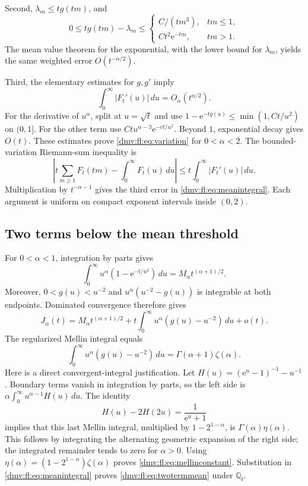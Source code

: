 \documentclass[11pt,letterpaper]{article}
\numberwithin{equation}{section}
\theoremstyle{definition}\newtheorem{definition}[theorem]{Definition}
\theoremstyle{remark}\newtheorem{remark}[theorem]{Remark}
\newcommand{\ee}{\mathrm e}
\newcommand{\Q}{\mathbb Q}
\begin{document}
Second, $\lambda_m\le tg(tm)$, and
\[
 0\le tg(tm)-\lambda_m\le
 \begin{cases}
 C/(tm^3),&tm\le1,\\
 Ct^2\ee^{-tm},&tm>1.
 \end{cases}
\]
The mean value theorem for the exponential, with the lower bound for
$\lambda_m$, yields the same weighted error $O(t^{-\alpha/2})$.

Third, the elementary estimates for $g,g'$ imply
\begin{equation}\label{dmv:fl:eq:variation}
 \int_0^\infty|F_t'(u)|\,du=O_\alpha(t^{\alpha/2}).
\end{equation}
For the derivative of $u^\alpha$, split at $u=\sqrt t$ and use
$1-\ee^{-tg(u)}\le\min(1,Ct/u^2)$ on $(0,1]$. For the other term
use $Ct u^{\alpha-3}\ee^{-ct/u^2}$. Beyond $1$, exponential decay
gives $O(t)$. These estimates prove \eqref{dmv:fl:eq:variation} for
$0<\alpha<2$. The bounded-variation Riemann-sum inequality is
\[
 \left|t\sum_{m\ge1}F_t(tm)-\int_0^\infty F_t(u)\,du\right|
 \le t\int_0^\infty|F_t'(u)|\,du.
\]
Multiplication by $t^{-\alpha-1}$ gives the third error in
\eqref{dmv:fl:eq:meanintegral}. Each argument is uniform on compact exponent
intervals inside $(0,2)$.

\subsection{Two terms below the mean threshold}
For $0<\alpha<1$, integration by parts gives
\[
 \int_0^\infty u^\alpha(1-\ee^{-t/u^2})\,du
 =M_\alpha t^{(\alpha+1)/2}.
\]
Moreover, $0<g(u)<u^{-2}$ and
$u^\alpha(u^{-2}-g(u))$ is integrable at both endpoints.
Dominated convergence therefore gives
\begin{equation}\label{dmv:fl:eq:regularmean}
 J_\alpha(t)=M_\alpha t^{(\alpha+1)/2}
 +t\int_0^\infty u^\alpha(g(u)-u^{-2})\,du+o(t).
\end{equation}
The regularized Mellin integral equals
\begin{equation}\label{dmv:fl:eq:mellinconstant}
 \int_0^\infty u^\alpha(g(u)-u^{-2})\,du
 =\Gamma(\alpha+1)\zeta(\alpha).
\end{equation}
Here is a direct convergent-integral justification. Let
$H(u)=(\ee^u-1)^{-1}-u^{-1}$. Boundary terms vanish in integration
by parts, so the left side is
$\alpha\int_0^\infty u^{\alpha-1}H(u)\,du$.
The identity
\[
 H(u)-2H(2u)=\frac1{\ee^u+1}
\]
implies that this last Mellin integral, multiplied by
$1-2^{1-\alpha}$, is $\Gamma(\alpha)\eta(\alpha)$.
This follows by integrating the alternating geometric expansion of the
right side; the integrated remainder tends to zero for $\alpha>0$.
Using $\eta(\alpha)=(1-2^{1-\alpha})\zeta(\alpha)$ proves
\eqref{dmv:fl:eq:mellinconstant}. Substitution in \eqref{dmv:fl:eq:meanintegral}
proves \eqref{dmv:fl:eq:twotermmean} under $\Q_t$.
\end{document}
